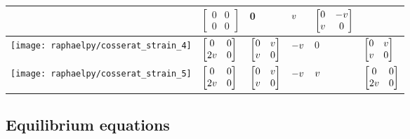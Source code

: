 {\begin{table}
\begin{tabular}{|C{2.7cm}|C{1.5cm}|C{1.7cm}|C{1.6cm}|C{1cm}|C{2.8cm}|}
		&
		$\begin{bmatrix} 0 & 0 \\ 0 & 0 \end{bmatrix}$
		&
		0
		&
		$v$
		&
		$\begin{bmatrix} 0 & -v \\ v & 0 \end{bmatrix}$
		\\
		\hline
		\texttt{[image: raphaelpy/cosserat\_strain\_4]}
		&
		$\begin{bmatrix} 0 & 0 \\ 2v & 0 \end{bmatrix}$
		&
		$\begin{bmatrix} 0 & v \\ v & 0 \end{bmatrix}$
		&
		$-v$
		&
		0
		&
		$\begin{bmatrix} 0 & v \\ v & 0 \end{bmatrix}$
		\\
		\hline
		\texttt{[image: raphaelpy/cosserat\_strain\_5]}
		&
		$\begin{bmatrix} 0 & 0 \\ 2v & 0 \end{bmatrix}$
		&
		$\begin{bmatrix} 0 & v \\ v & 0 \end{bmatrix}$
		&
		$-v$
		&
		$v$
		&
		$\begin{bmatrix} 0 & 0 \\ 2v & 0 \end{bmatrix}$
		\\
		\hline
	\end{tabular}
	\label{tabAppendixMathCosseratStrain}
\end{table}




\subsection{Equilibrium equations}

}
